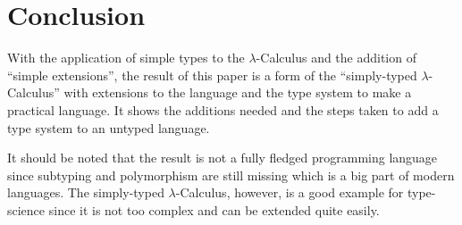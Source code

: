 \section{Conclusion}

With the application of simple types to the $\lambda$-Calculus
and the addition of ``simple extensions'', the result of this paper
is a form of the ``simply-typed $\lambda$-Calculus'' with extensions to
the language and the type system to make a practical language. It shows
the additions needed and the steps taken to add a type system to an
untyped language. 

It should be noted that the result is not a fully fledged programming language since
subtyping and polymorphism are still missing which is a big part of
modern languages. The simply-typed $\lambda$-Calculus, however, is
a good example for type-science since it is not too complex and
can be extended quite easily.
